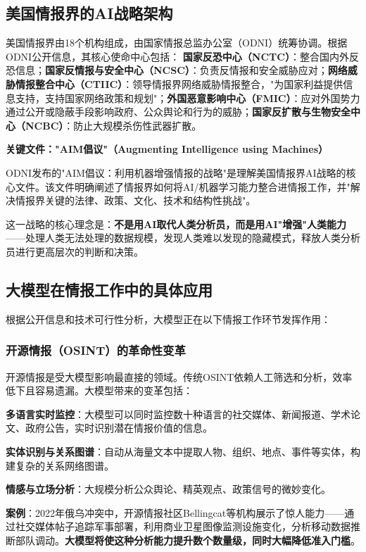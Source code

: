 \subsection{美国情报界的AI战略架构}

美国情报界由18个机构组成，由国家情报总监办公室（ODNI）统筹协调。根据ODNI公开信息，其核心使命中心包括：
\textbf{国家反恐中心（NCTC）}：整合国内外反恐信息；\textbf{国家反情报与安全中心（NCSC）}：负责反情报和安全威胁应对；\textbf{网络威胁情报整合中心（CTIIC）}：领导情报界网络威胁情报整合，"为国家利益提供信息支持，支持国家网络政策和规划"；\textbf{外国恶意影响中心（FMIC）}：应对外国势力通过公开或隐蔽手段影响政府、公众舆论和行为的威胁；\textbf{国家反扩散与生物安全中心（NCBC）}：防止大规模杀伤性武器扩散。

\textbf{关键文件："AIM倡议"（Augmenting Intelligence using Machines）}

ODNI发布的"AIM倡议：利用机器增强情报的战略"是理解美国情报界AI战略的核心文件。该文件明确阐述了情报界如何将AI/机器学习能力整合进情报工作，并"解决情报界关键的法律、政策、文化、技术和结构性挑战"。

这一战略的核心理念是：\textbf{不是用AI取代人类分析员，而是用AI"增强"人类能力}——处理人类无法处理的数据规模，发现人类难以发现的隐藏模式，释放人类分析员进行更高层次的判断和决策。

\subsection{大模型在情报工作中的具体应用}

根据公开信息和技术可行性分析，大模型正在以下情报工作环节发挥作用：

\subsubsection{开源情报（OSINT）的革命性变革}

开源情报是受大模型影响最直接的领域。传统OSINT依赖人工筛选和分析，效率低下且容易遗漏。大模型带来的变革包括：

\textbf{多语言实时监控}：大模型可以同时监控数十种语言的社交媒体、新闻报道、学术论文、政府公告，实时识别潜在情报价值的信息。

\textbf{实体识别与关系图谱}：自动从海量文本中提取人物、组织、地点、事件等实体，构建复杂的关系网络图谱。

\textbf{情感与立场分析}：大规模分析公众舆论、精英观点、政策信号的微妙变化。

\textbf{案例}：2022年俄乌冲突中，开源情报社区Bellingcat等机构展示了惊人能力——通过社交媒体帖子追踪军事部署，利用商业卫星图像监测设施变化，分析移动数据推断部队调动。\textbf{大模型将使这种分析能力提升数个数量级，同时大幅降低准入门槛}。

